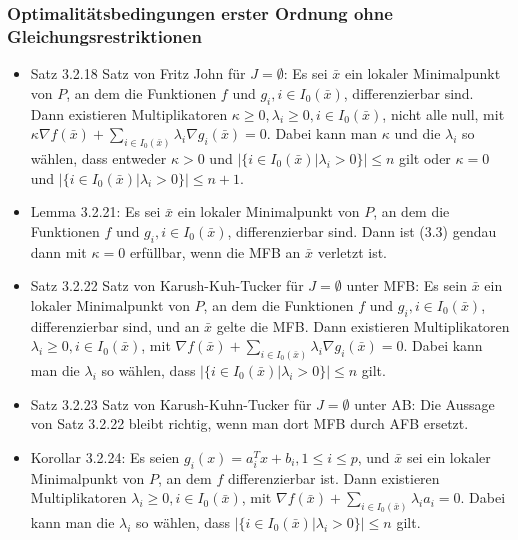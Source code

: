 \documentclass[paper=a4, fontsize=11pt]{scrartcl} %
\numberwithin{equation}{section} %
\numberwithin{figure}{section} %
\numberwithin{table}{section} %
\begin{document}
\subsubsection{Optimalitätsbedingungen erster Ordnung ohne Gleichungsrestriktionen}

\begin{itemize}
  \item Satz 3.2.18 Satz von Fritz John für $J = \emptyset$: Es sei $\bar{x}$ ein lokaler Minimalpunkt von $P$, an dem die Funktionen $f$ und $g_i, i \in I_0(\bar{x})$, differenzierbar sind. Dann existieren Multiplikatoren $\kappa \ge 0, \lambda_i \ge 0, i \in I_0(\bar{x})$, nicht alle null, mit $\kappa \nabla f(\bar{x}) + \sum\limits_{i \in I_0(\bar{x})} \lambda_i \nabla g_i(\bar{x}) = 0$. Dabei kann man $\kappa$ und die $\lambda_i$ so wählen, dass entweder $\kappa > 0$ und $|\{i \in I_0(\bar{x}) | \lambda_i > 0\}| \le n$ gilt oder $\kappa = 0$ und $|\{i \in I_0(\bar{x}) | \lambda_i > 0\}| \le n + 1$.
  \item Lemma 3.2.21: Es sei $\bar{x}$ ein lokaler Minimalpunkt von $P$, an dem die Funktionen $f$ und $g_i, i \in I_0(\bar{x})$, differenzierbar sind. Dann ist (3.3) gendau dann mit $\kappa = 0$ erfüllbar, wenn die MFB an $\bar{x}$ verletzt ist.
  \item Satz 3.2.22 Satz von Karush-Kuh-Tucker für $J = \emptyset$ unter MFB: Es sein $\bar{x}$ ein lokaler Minimalpunkt von $P$, an dem die Funktionen $f$ und $g_i, i \in I_0(\bar{x})$, differenzierbar sind, und an $\bar{x}$ gelte die MFB. Dann existieren Multiplikatoren $\lambda_i \ge 0, i \in I_0(\bar{x})$, mit $\nabla f(\bar{x}) + \sum\limits_{i \in I_0(\bar{x})} \lambda_i \nabla g_i(\bar{x}) = 0$. Dabei kann man die $\lambda_i$ so wählen, dass $|\{i \in I_0(\bar{x})|\lambda_i > 0\}| \le n$ gilt.
  \item Satz 3.2.23 Satz von Karush-Kuhn-Tucker für $J = \emptyset$ unter AB: Die Aussage von Satz 3.2.22 bleibt richtig, wenn man dort MFB durch AFB ersetzt.
  \item Korollar 3.2.24: Es seien $g_i(x) = a^T_i x + b_i, 1 \le i \le p$, und $\bar{x}$ sei ein lokaler Minimalpunkt von $P$, an dem $f$ differenzierbar ist. Dann existieren Multiplikatoren $\lambda_i \ge 0, i \in I_0(\bar{x})$, mit $\nabla f(\bar{x}) + \sum\limits_{i \in I_0(\bar{x})} \lambda_i a_i = 0$. Dabei kann man die $\lambda_i$ so wählen, dass $|\{i \in I_0(\bar{x}) | \lambda_i > 0\}| \le n$ gilt.
\end{itemize}
\end{document}
